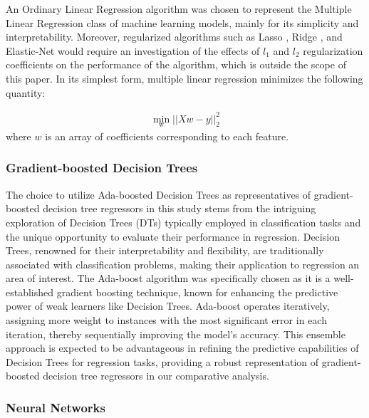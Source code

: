 \documentclass[12pt]{article}
\begin{document}
An Ordinary Linear Regression algorithm was chosen to represent the Multiple Linear Regression class of machine learning models, mainly for its simplicity and interpretability. Moreover, regularized algorithms such as Lasso \cite{kim_interior-point_2007}, Ridge \cite{rifkin_notes_nodate}, and Elastic-Net \cite{zou_degrees_2007} would require an investigation of the effects of $l_1$ and $l_2$ regularization coefficients on the performance of the algorithm, which is outside the scope of this paper. In its simplest form, multiple linear regression minimizes the following quantity:

\begin{gather*}
	\min_{\text{w}}||Xw - y ||_2^2
\end{gather*}
where $w$ is an array of coefficients corresponding to each feature.

\subsubsection{Gradient-boosted Decision Trees}

The choice to utilize Ada-boosted Decision Trees as representatives of gradient-boosted decision tree regressors in this study stems from the intriguing exploration of Decision Trees (DTs) typically employed in classification tasks and the unique opportunity to evaluate their performance in regression. Decision Trees, renowned for their interpretability and flexibility, are traditionally associated with classification problems, making their application to regression an area of interest. The Ada-boost algorithm \cite{drucker_improving_nodate} was specifically chosen as it is a well-established gradient boosting technique, known for enhancing the predictive power of weak learners like Decision Trees. Ada-boost operates iteratively, assigning more weight to instances with the most significant error in each iteration, thereby sequentially improving the model's accuracy. This ensemble approach is expected to be advantageous in refining the predictive capabilities of Decision Trees for regression tasks, providing a robust representation of gradient-boosted decision tree regressors in our comparative analysis.

\subsubsection{Neural Networks}
\end{document}
